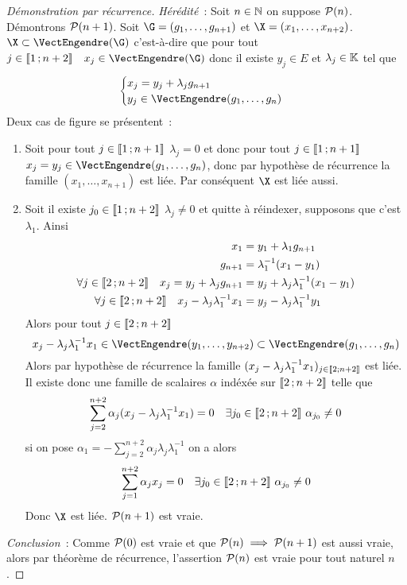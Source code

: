 \begin{proof}[Démonstration par récurrence]
  \emph{Hérédité}~: Soit $n \in \N$ on suppose $\P(n)$. Démontrons $\P(n+1)$. Soit $\G=(g_1, \ldots, g_{n+1})$ et $\X=(x_1, \ldots, x_{n+2})$. $\X \subset \VectEngendre(\G)$ c'est-à-dire que pour tout $j \in \intervalleentier{1}{n+2} \quad x_j \in \VectEngendre(\G)$ donc il existe $y_j \in E$ et $\lambda_j \in \K$ tel que
  \begin{equation}
    \begin{cases} x_j = y_j + \lambda_j g_{n+1} \\ y_j \in \VectEngendre(g_1, \ldots, g_n) \end{cases}
  \end{equation}
  Deux cas de figure se présentent~:
  \begin{enumerate}
  \item Soit pour tout $j \in \intervalleentier{1}{n+1}$ $\lambda_j=0$ et donc pour tout $j \in \intervalleentier{1}{n+1}$ $x_j=y_j \in \VectEngendre(g_1, \ldots, g_n)$, donc par hypothèse de récurrence la famille $(x_1, \ldots, x_{n+1})$ est liée. Par conséquent $\X$ est liée aussi.
  \item Soit il existe $j_0 \in \intervalleentier{1}{n+2}$ $\lambda_j \neq 0$ et quitte à réindexer, supposons que c'est $\lambda_1$. Ainsi
    \begin{align}
      x_1 &= y_1 + \lambda_1 g_{n+1} \\
      g_{n+1} &= \lambda_1^{-1}(x_1-y_1) \\
      \forall j \in \intervalleentier{2}{n+2} \quad x_j = y_j + \lambda_j g_{n+1} &= y_j + \lambda_j \lambda_1^{-1}(x_1-y_1)\\
      \forall j \in \intervalleentier{2}{n+2} \quad x_j - \lambda_j\lambda_1^{-1}x_1 &= y_j - \lambda_j \lambda_1^{-1} y_1
    \end{align}
    Alors pour tout $j \in \intervalleentier{2}{n+2}$
    \begin{equation}
      x_j - \lambda_j\lambda_1^{-1}x_1 \in \VectEngendre(y_1, \ldots, y_{n+2}) \subset \VectEngendre(g_1, \ldots, g_n)
    \end{equation}
    Alors par hypothèse de récurrence la famille $(x_j-\lambda_j\lambda_1^{-1}x_1)_{j \in \intervalleentier{2}{n+2}}$ est liée. Il existe donc une famille de scalaires $\alpha$ indéxée sur $\intervalleentier{2}{n+2}$ telle que
    \begin{equation}
      \sum_{j=2}^{n+2} \alpha_j (x_j-\lambda_j\lambda_1^{-1}x_1) = 0 \quad \exists j_0 \in \intervalleentier{2}{n+2} \ \alpha_{j_0} \neq 0
    \end{equation}
    si on pose $\alpha_1=-\sum_{j=2}^{n+2} \alpha_j \lambda_j \lambda_1^{-1}$ on a alors
    \begin{equation}
      \sum_{j=1}^{n+2} \alpha_j x_j =0 \quad \exists j_0 \in \intervalleentier{2}{n+2} \ \alpha_{j_0} \neq 0
    \end{equation}
    Donc $\X$ est liée. $\P(n+1)$ est vraie.
  \end{enumerate}

  \emph{Conclusion}~: Comme $\P(0)$ est vraie et que $\P(n) \implies \P(n+1)$ est aussi vraie, alors par théorème de récurrence, l'assertion $\P(n)$ est vraie pour tout naturel $n$.
\end{proof}

